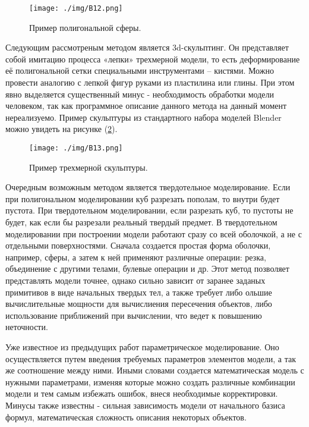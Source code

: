 \begin{figure} 
\begin{center}
\texttt{[image: ./img/B12.png]}
\end{center}
\caption{Пример полигональной сферы.}
\label{pic:B12}
\end{figure}

Следующим рассмотреным методом является 3d-скульптинг. Он представляет собой имитацию процесса «лепки» трехмерной модели, то есть деформирование её полигональной сетки специальными инструментами – кистями. Можно провести аналогию с лепкой фигур руками из пластилина или глины. При этом явно выделяется существенный минус - необходимость обработки модели человеком, так как программное описание данного метода на данный момент нереализуемо. Пример скульптуры из стандартного набора моделей Blender можно увидеть на рисунке (\ref{pic:B13}).

\begin{figure} 
\begin{center}
\texttt{[image: ./img/B13.png]}
\end{center}
\caption{Пример трехмерной скульптуры.}
\label{pic:B13}
\end{figure}

Очередным возможным методом является твердотельное моделирование. Если при полигональном моделировании куб разрезать пополам, то внутри будет пустота. При твердотельном моделировании, если разрезать куб, то  пустоты не будет, как если бы разрезали реальный твердый предмет. В твердотельном моделировании при построении модели работают сразу со всей оболочкой, а не с отдельными поверхностями. Сначала создается простая форма оболочки, например, сферы, а затем к ней применяют различные операции: резка, объединение с другими телами, булевые операции и др. Этот метод позволяет представлять модели точнее, однако сильно зависит от заранее заданых примитивов в виде начальных твердых тел, а также требует либо ольшие вычислительные мощности для вычислиения пересечения объектов, либо использование приближений при вычислении, что ведет к повышению неточности. 

Уже известное из предыдущих работ параметрическое моделирование. Оно осуществляется путем введения требуемых параметров элементов модели, а так же соотношение между ними. Иными словами создается математическая модель с нужными параметрами, изменяя которые можно создать различные комбинации модели и тем самым избежать ошибок, внеся необходимые корректировки. Минусы также известны - сильная зависимость модели от начального базиса формул, математическая сложность описания некоторых объектов.

